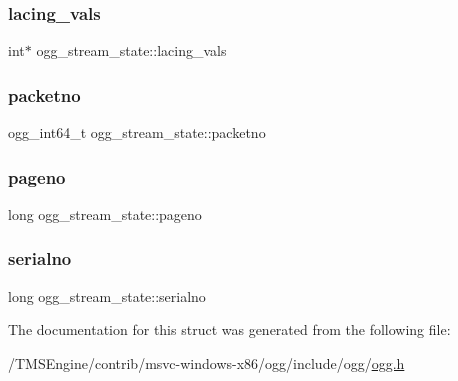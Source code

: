 \subsubsection{\texorpdfstring{lacing\+\_\+vals}{lacing\_vals}}
{\footnotesize\ttfamily int$\ast$ ogg\+\_\+stream\+\_\+state\+::lacing\+\_\+vals}

\mbox{\label{structogg__stream__state_a1bebf380025b6ca0841497e7ab2b5c34}} 
\subsubsection{\texorpdfstring{packetno}{packetno}}
{\footnotesize\ttfamily ogg\+\_\+int64\+\_\+t ogg\+\_\+stream\+\_\+state\+::packetno}

\mbox{\label{structogg__stream__state_a0ad3315203fcebdc2ccd3b050d28a65c}} 
\subsubsection{\texorpdfstring{pageno}{pageno}}
{\footnotesize\ttfamily long ogg\+\_\+stream\+\_\+state\+::pageno}

\mbox{\label{structogg__stream__state_a79248e3f1f41cde5331909e8edd98e10}} 
\subsubsection{\texorpdfstring{serialno}{serialno}}
{\footnotesize\ttfamily long ogg\+\_\+stream\+\_\+state\+::serialno}



The documentation for this struct was generated from the following file\+:\begin{DoxyCompactItemize}
\item 
/\+T\+M\+S\+Engine/contrib/msvc-\/windows-\/x86/ogg/include/ogg/\hyperlink{ogg_8h}{ogg.\+h}\end{DoxyCompactItemize}

